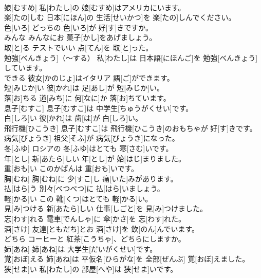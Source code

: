 \documentclass[8pt]{extreport}
\begin{document}
\begin{CJK}{UTF8}{min}
\\	娘[むすめ]	私[わたし]の 娘[むすめ]はアメリカにいます。		
\\	楽[たの]しむ	日本[にほん]の 生活[せいかつ]を 楽[たの]しんでください。		
\\	色[いろ]	どっちの 色[いろ]が 好[す]きですか。		
\\	みんな	みんなにお 菓子[かし]をあげましょう。		
\\	取[と]る	テストでいい 点[てん]を 取[と]った。		
\\	勉強[べんきょう]（～する）	私[わたし]は 日本語[にほんご]を 勉強[べんきょう]しています。		
\\	できる	彼女[かのじょ]はイタリア 語[ご]ができます。		
\\	短[みじか]い	彼[かれ]は 足[あし]が 短[みじか]い。		
\\	落[お]ちる	道[みち]に 何[なに]か 落[お]ちています。		
\\	息子[むすこ]	息子[むすこ]は 中学生[ちゅうがくせい]です。		
\\	白[しろ]い	彼[かれ]は 歯[は]が 白[しろ]い。		
\\	飛行機[ひこうき]	息子[むすこ]は 飛行機[ひこうき]のおもちゃが 好[す]きです。		
\\	病気[びょうき]	祖父[そふ]が 病気[びょうき]になった。		
\\	冬[ふゆ]	ロシアの 冬[ふゆ]はとても 寒[さむ]いです。		
\\	年[とし]	新[あたら]しい 年[とし]が 始[はじ]まりました。		
\\	重[おも]い	このかばんは 重[おも]いです。		
\\	胸[むね]	胸[むね]に 少[すこ]し 痛[いた]みがあります。		
\\	払[はら]う	別々[べつべつ]に 払[はら]いましょう。		
\\	軽[かる]い	この 靴[くつ]はとても 軽[かる]い。		
\\	見[み]つける	新[あたら]しい 仕事[しごと]を 見[み]つけました。		
\\	忘[わす]れる	電車[でんしゃ]に 傘[かさ]を 忘[わす]れた。		
\\	酒[さけ]	友達[ともだち]とお 酒[さけ]を 飲[のん]んでいます。		
\\	どちら	コーヒーと 紅茶[こうちゃ]、どちらにしますか。		
\\	姉[あね]	姉[あね]は 大学生[だいがくせい]です。		
\\	覚[おぼ]える	姉[あね]は 平仮名[ひらがな]を 全部[ぜんぶ] 覚[おぼ]えました。		
\\	狭[せま]い	私[わたし]の 部屋[へや]は 狭[せま]いです。		

\end{CJK}
\end{document}
